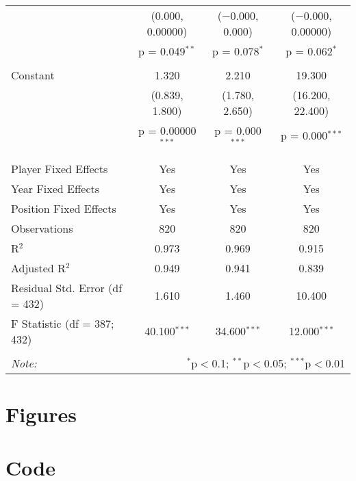 \documentclass[12pt]{article}
\begin{document}
\begin{landscape}
\begin{table}[!htbp]
\begin{tabular}{@{\extracolsep{5pt}}lccc}
			& (0.000, 0.00000) & ($-$0.000, 0.000) & ($-$0.000, 0.00000) \\ 
			& p = 0.049$^{**}$ & p = 0.078$^{*}$ & p = 0.062$^{*}$ \\ 
			& & & \\ 
			Constant & 1.320 & 2.210 & 19.300 \\ 
			& (0.839, 1.800) & (1.780, 2.650) & (16.200, 22.400) \\ 
			& p = 0.00000$^{***}$ & p = 0.000$^{***}$ & p = 0.000$^{***}$ \\ 
			& & & \\ 
			\hline \\[-1.8ex] 
			Player Fixed Effects & Yes & Yes & Yes \\ 
			Year Fixed Effects & Yes & Yes & Yes \\ 
			Position Fixed Effects & Yes & Yes & Yes \\ 
			Observations & 820 & 820 & 820 \\ 
			R$^{2}$ & 0.973 & 0.969 & 0.915 \\ 
			Adjusted R$^{2}$ & 0.949 & 0.941 & 0.839 \\ 
			Residual Std. Error (df = 432) & 1.610 & 1.460 & 10.400 \\ 
			F Statistic (df = 387; 432) & 40.100$^{***}$ & 34.600$^{***}$ & 12.000$^{***}$ \\ 
			\hline 
			\hline \\[-1.8ex] 
			\textit{Note:}  & \multicolumn{3}{r}{$^{*}$p$<$0.1; $^{**}$p$<$0.05; $^{***}$p$<$0.01} \\ 
		\end{tabular} 
	\end{table} 
	\end{landscape}
	
	\clearpage
	
	\section{Figures} \label{sec:fig}
	
	
	
	
	
	\clearpage
	
	\section{Code} \label{sec:code}
	
	
	
	
	
	\clearpage
	
	
\end{document}
